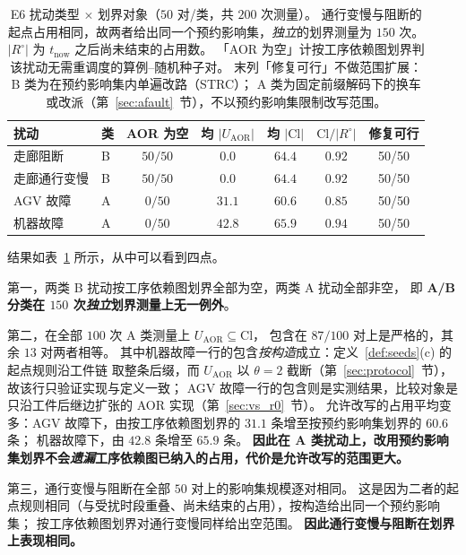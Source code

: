 \documentclass[manuscript,screen,review]{acmart}
\providecommand{\STRC}{\textsc{STRC}}
\newcommand{\NPairs}{50}
\newcommand{\StrictlyLarger}{87/100}
\newcommand{\FeasESixBlock}{\NPairs/\NPairs}
\newcommand{\FeasSlow}{\NPairs/\NPairs}
\newcommand{\FeasESixAgv}{\NPairs/\NPairs}
\newcommand{\FeasESixRa}{\NPairs/\NPairs}
\begin{document}
\begin{table}[t]
\centering
\caption{E6 扰动类型 \(\times\) 划界对象（\(\NPairs\) 对/类，共 \(200\) 次测量）。
通行变慢与阻断的起点占用相同，故两者给出同一个预约影响集，\emph{独立}的划界测量为 \(150\) 次。
\(|R^{\circ}|\) 为 \(t_{\mathrm{now}}\) 之后尚未结束的占用数。
「AOR 为空」计按工序依赖图划界判该扰动无需重调度的算例--随机种子对。
末列「修复可行」不做范围扩展：B 类为在预约影响集内单遍改路（\STRC{}）；
A 类为固定前缀解码下的换车或改派（第~\ref{sec:afault}~节），不以预约影响集限制改写范围。}
\label{tab:e6}
\small
\begin{tabular}{@{}llccccc@{}}
\toprule
扰动 & 类 & AOR 为空 & 均 \(|U_{\mathrm{AOR}}|\) & 均 \(|\mathrm{Cl}|\)
 & \(\mathrm{Cl}/|R^{\circ}|\) & 修复可行 \\
\midrule
走廊阻断   & B & \(50/50\) & \(0.0\)  & \(64.4\) & \(0.92\) & \FeasESixBlock \\
走廊通行变慢 & B & \(50/50\) & \(0.0\)  & \(64.4\) & \(0.92\) & \FeasSlow \\
AGV 故障   & A & \(0/50\)  & \(31.1\) & \(60.6\) & \(0.85\) & \FeasESixAgv \\
机器故障 & A & \(0/50\)  & \(42.8\) & \(65.9\) & \(0.94\) & \FeasESixRa \\
\bottomrule
\end{tabular}
\end{table}

结果如表~\ref{tab:e6} 所示，从中可以看到四点。

第一，两类 B 扰动按工序依赖图划界全部为空，两类 A 扰动全部非空，
即 \textbf{A/B 分类在 \(150\) 次\emph{独立}划界测量上无一例外}。

第二，在全部 \(100\) 次 A 类测量上 \(U_{\mathrm{AOR}}\subseteq\mathrm{Cl}\)，
包含在 \(\StrictlyLarger\) 对上是严格的，其余 \(13\) 对两者相等。
其中机器故障一行的包含\emph{按构造}成立：定义~\ref{def:seeds}(c) 的起点规则沿工件链
取整条后缀，而 \(U_{\mathrm{AOR}}\) 以 \(\theta=2\) 截断（第~\ref{sec:protocol}~节），故该行只验证实现与定义一致；
AGV 故障一行的包含则是实测结果，比较对象是只沿工件后继边扩张的 AOR 实现（第~\ref{sec:vs_r0}~节）。
允许改写的占用平均变多：AGV 故障下，由按工序依赖图划界的 \(31.1\) 条增至按预约影响集划界的 \(60.6\) 条；
机器故障下，由 \(42.8\) 条增至 \(65.9\) 条。
\textbf{因此在 A 类扰动上，改用预约影响集划界不会\emph{遗漏}工序依赖图已纳入的占用，代价是允许改写的范围更大。}

第三，通行变慢与阻断在全部 \(50\) 对上的影响集规模逐对相同。
这是因为二者的起点规则相同（与受扰时段重叠、尚未结束的占用），按构造给出同一个预约影响集；
按工序依赖图划界对通行变慢同样给出空范围。
\textbf{因此通行变慢与阻断在划界上表现相同。}
\end{document}
